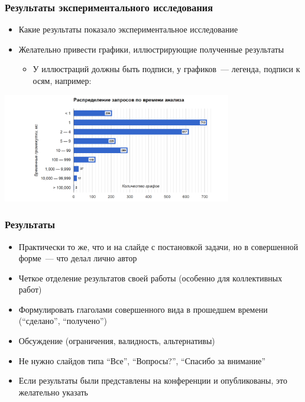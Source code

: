 \documentclass[aspectratio=169]{beamer}
\begin{document}
\begin{frame}[t]
	\frametitle{Результаты экспериментального исследования}
	\begin{itemize}
		\item Какие результаты показало экспериментальное исследование
		\item Желательно привести графики, иллюстрирующие полученные результаты
		      \begin{itemize}
			      \item У иллюстраций должны быть подписи, у графиков~--- легенда, подписи к осям, например:
		      \end{itemize}
	\end{itemize}
	\includegraphics[width=10cm]{pictures/dist.png}
\end{frame}

\begin{frame}
	\frametitle{Результаты}
	\begin{itemize}
		\item Практически то же, что и на слайде с постановкой задачи, но в совершенной форме~--- что делал лично автор
		\item Четкое отделение результатов своей работы (особенно для коллективных работ)
		\item Формулировать глаголами совершенного вида в прошедшем времени (\enquote{сделано}, \enquote{получено})
		\item Обсуждение (ограничения, валидность, альтернативы)
		\item Не нужно слайдов типа \enquote{Все}, \enquote{Вопросы?}, \enquote{Спасибо за внимание}
	\end{itemize}

	\begin{itemize}
		\item Если результаты были представлены на конференции и опубликованы, это желательно указать
	\end{itemize}
\end{frame}

\appendix
\end{document}

